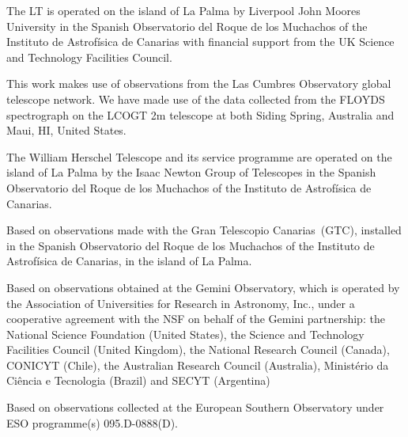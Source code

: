\documentclass[linenumbers, twocolumn]{aastex631}
\begin{document}
The LT is operated on the island of La Palma by Liverpool
John Moores University in the Spanish Observatorio del Roque
de los Muchachos of the Instituto de Astrof{\'i}sica de Canarias with
financial support from the UK Science and Technology Facilities
Council.

This work makes use of observations from the Las Cumbres Observatory
global telescope network. We have made use of the data collected from
the FLOYDS spectrograph on the LCOGT 2m telescope at both Siding Spring,
Australia and Maui, HI, United States.

The William Herschel Telescope and its service programme are operated
on the island of La Palma by the Isaac Newton Group of Telescopes in
the Spanish Observatorio del Roque de los Muchachos of the Instituto
de Astrof\'isica de Canarias.

Based on observations made with the Gran Telescopio Canarias~(GTC), installed 
in the Spanish Observatorio del Roque de los Muchachos of the Instituto de 
Astrof\'isica de Canarias, in the island of La Palma.

Based on observations obtained at the Gemini Observatory, which is operated by the
Association of Universities for Research in Astronomy, Inc., under a cooperative agreement
with the NSF on behalf of the Gemini partnership: the National Science Foundation (United
States), the Science and Technology Facilities Council (United Kingdom), the
National Research Council (Canada), CONICYT (Chile), the Australian Research Council
(Australia), Ministério da Ciência e Tecnologia (Brazil) and SECYT (Argentina)

Based on observations collected at the European Southern Observatory under ESO programme(s) 095.D-0888(D).




{}



\end{document}
